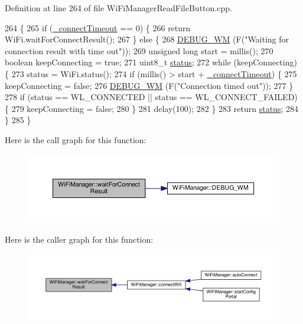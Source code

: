Definition at line 264 of file Wi\+Fi\+Manager\+Read\+File\+Button.\+cpp.


\begin{DoxyCode}
264                                           \{
265   \textcolor{keywordflow}{if} (\hyperlink{class_wi_fi_manager_a6c03ca5d418b4d46e9a6d751a902184c}{\_connectTimeout} == 0) \{
266     \textcolor{keywordflow}{return} WiFi.waitForConnectResult();
267   \} \textcolor{keywordflow}{else} \{
268     \hyperlink{class_wi_fi_manager_ae5f595c670ccbcf9a191baf50f5c7c26}{DEBUG\_WM} (F(\textcolor{stringliteral}{"Waiting for connection result with time out"}));
269     \textcolor{keywordtype}{unsigned} \textcolor{keywordtype}{long} start = millis();
270     \textcolor{keywordtype}{boolean} keepConnecting = \textcolor{keyword}{true};
271     uint8\_t \hyperlink{class_wi_fi_manager_acceea0054a30c18809b34151d4e9eb0b}{status};
272     \textcolor{keywordflow}{while} (keepConnecting) \{
273       status = WiFi.status();
274       \textcolor{keywordflow}{if} (millis() > start + \hyperlink{class_wi_fi_manager_a6c03ca5d418b4d46e9a6d751a902184c}{\_connectTimeout}) \{
275         keepConnecting = \textcolor{keyword}{false};
276         \hyperlink{class_wi_fi_manager_ae5f595c670ccbcf9a191baf50f5c7c26}{DEBUG\_WM} (F(\textcolor{stringliteral}{"Connection timed out"}));
277       \}
278       \textcolor{keywordflow}{if} (status == WL\_CONNECTED || status == WL\_CONNECT\_FAILED) \{
279         keepConnecting = \textcolor{keyword}{false};
280       \}
281       delay(100);
282     \}
283     \textcolor{keywordflow}{return} \hyperlink{class_wi_fi_manager_acceea0054a30c18809b34151d4e9eb0b}{status};
284   \}
285 \}
\end{DoxyCode}
Here is the call graph for this function\+:\nopagebreak
\begin{figure}[H]
\begin{center}
\leavevmode
\includegraphics[width=350pt]{d4/dc8/class_wi_fi_manager_a89a3f33997aa662ad223d6c150c1eede_cgraph}
\end{center}
\end{figure}
Here is the caller graph for this function\+:\nopagebreak
\begin{figure}[H]
\begin{center}
\leavevmode
\includegraphics[width=350pt]{d4/dc8/class_wi_fi_manager_a89a3f33997aa662ad223d6c150c1eede_icgraph}
\end{center}
\end{figure}



